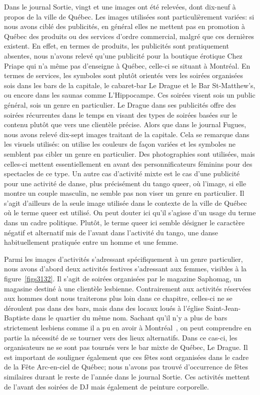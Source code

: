 Dans le journal Sortie, vingt et une images ont été relevées, dont dix-neuf à propos de la ville de Québec. 
Les images utilisées sont particulièrement variées: si nous avons ciblé des publicités, en général elles ne mettent pas en promotion à Québec des produits ou des services d'ordre commercial, malgré que ces dernières existent. 
En effet, en termes de produits, les publicités sont pratiquement absentes, nous n'avons relevé qu'une publicité pour la boutique érotique Chez Priape qui n'a même pas d'enseigne à Québec, celle-ci se situant à Montréal. 
En termes de services, les symboles sont plutôt orientés vers les soirées organisées sois dans les bars de la capitale, le cabaret-bar Le Drague et le Bar St-Matthew’s, ou encore dans les saunas comme L'Hippocampe. 
Ces soirées visent sois un public général, sois un genre en particulier. 
Le Drague dans ses publicités offre des soirées récurrentes dans le temps en visant des types de soirées basées sur le contenu plutôt que vers une clientèle précise. 
Alors que dans le journal Fugues, nous avons relevé dix-sept images traitant de la capitale. 
Cela se remarque dans les visuels utilisés: on utilise les couleurs de façon variées et les symboles ne semblent pas cibler un genre en particulier. 
Des photographies sont utilisées, mais celles-ci mettent essentiellement en avant des personnificateurs féminins pour des spectacles de ce type. 
Un autre cas d'activité mixte est le cas d'une publicité pour une activité de danse, plus précisément du tango queer, où l'image, si elle montre un couple masculin, ne semble pas non viser un genre en particulier. 
Il s'agit d'ailleurs de la seule image utilisée dans le contexte de la ville de Québec où le terme queer est utilisé.
On peut douter ici qu'il s'agisse d'un usage du terme dans un cadre politique. Plutôt, le terme queer ici semble désigner le caractère négatif et alternatif mis de l'avant dans l'activité du tango, une danse habituellement pratiquée entre un homme et une femme.

Parmi les images d'activités s'adressant spécifiquement à un genre particulier, nous avons d'abord deux activités festives s'adressant aux femmes, visibles à la figure~\ref{figs3132}. 
Il s'agit de soirées organisées par le magazine Saphomag, un magasine destiné à une clientèle lesbienne. 
Contrairement aux activités réservées aux hommes dont nous traiterons plus loin dans ce chapitre, celles-ci ne se déroulent pas dans des bars, mais dans des locaux loués à l'église Saint-Jean-Baptiste dans le quartier du même nom. 
Sachant qu'il n'y a plus de bars strictement lesbiens comme il a pu en avoir à Montréal~\citep{Podmore2006}, on peut comprendre en partie la nécessité de se tourner vers des lieux alternatifs. Dans ce cas-ci, les organisateurs ne se sont pas tournés vers le bar mixte de Québec, Le Drague. 
Il est important de souligner également que ces fêtes sont organisées dans le cadre de la Fête Arc-en-ciel de Québec; nous n'avons pas trouvé d'occurrence de fêtes similaires durant le reste de l'année dans le journal Sortie. 
Ces activités mettent de l'avant des soirées de DJ mais également de peinture corporelle.

